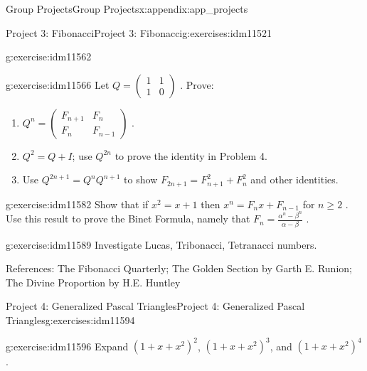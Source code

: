 \documentclass[oneside,10pt,]{book}
\numberwithin{equation}{chapter}
\newcommand{\amp}{&}
\begin{document}
\begin{appendixptx}{Group Projects}{}{Group Projects}{}{}{x:appendix:app_projects}
\begin{exercises-section-numberless}{Project 3: Fibonacci}{}{Project 3: Fibonacci}{}{}{g:exercises:idm11521}
\begin{divisionexercise}{6}{}{}{g:exercise:idm11562}
\begin{equation*}
\end{equation*}
%
\end{divisionexercise}%
\begin{divisionexercise}{7}{}{}{g:exercise:idm11566}%
Let \(Q =\begin{pmatrix}1 \amp 1 \\ 1 \amp 0\end{pmatrix}\) . Prove:%
\begin{enumerate}[label=(\alph*)]
\item{}\(Q^{n} = \begin{pmatrix} F_{n + 1} \amp F_{n}\\ F_{n} \amp F_{n - 1} \end{pmatrix}\) .%
\item{}\(Q^{2} = Q + I\); use \(Q^{2n}\) to prove the identity in Problem 4.%
\item{}Use \(Q^{2n + 1} = Q^{n}Q^{n + 1}\) to show \(F_{2n + 1} = F_{n + 1}^{2} + F_{n}^{2}\) and other identities.%
\end{enumerate}
%
\end{divisionexercise}%
\begin{divisionexercise}{8}{}{}{g:exercise:idm11582}%
Show that if \(x^{2} = x + 1\) then \(x^{n} = F_{n}x + F_{n - 1}\) for \(n \geq 2\) . Use this result to prove the Binet Formula, namely that \(F_{n} = \frac{\alpha^{n} - \beta^{n}}{\alpha - \beta}\) .%
\end{divisionexercise}%
\begin{divisionexercise}{9}{}{}{g:exercise:idm11589}%
Investigate Lucas, Tribonacci, Tetranacci numbers.%
\end{divisionexercise}%
\begin{conclusion}{}%
References: The Fibonacci Quarterly; The Golden Section by Garth E. Runion; The Divine Proportion by H.E. Huntley%
\end{conclusion}%
\end{exercises-section-numberless}
%
%
\typeout{************************************************}
\typeout{************************************************}
%
\begin{exercises-section-numberless}{Project 4: Generalized Pascal Triangles}{}{Project 4: Generalized Pascal Triangles}{}{}{g:exercises:idm11594}
\begin{divisionexercise}{1}{}{}{g:exercise:idm11596}%
Expand \({\left( 1 + x + x^{2} \right)}^{2}\), \(\left( 1 + x + x^{2} \right)^{3}\), and \(\left( 1 + x + x^{2} \right)^{4}\).%

\end{divisionexercise}
\end{exercises-section-numberless}
\end{appendixptx}
\end{document}
